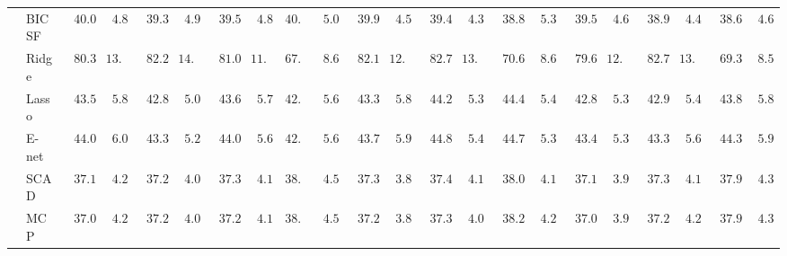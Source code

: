 \begin{tabular}{p{0.2cm}p{1cm}|p{0.6cm}p{0.6cm}|p{0.6cm}p{0.6cm}p{0.6cm}p{0.6cm}p{0.6cm}p{0.6cm}|p{0.6cm}p{0.6cm}p{0.6cm}p{0.6cm}p{0.6cm}p{0.6cm}|p{0.6cm}p{0.6cm}p{0.6cm}p{0.6cm}p{0.6cm}p{0.6cm}}
 & BIC SF  & $\phantom{0}40.00$ & $\phantom{0}4.83$ & $\phantom{0}39.36$ & $\phantom{0}4.97$ & $\phantom{0}39.51$ & $\phantom{0}4.85$ & $40.31$ & $\phantom{0}5.00$ & $\phantom{0}39.90$ & $\phantom{0}4.50$ & $\phantom{0}39.46$ & $\phantom{0}4.39$ & $\phantom{0}38.89$ & $\phantom{0}5.30$ & $\phantom{0}39.50$ & $\phantom{0}4.67$ & $\phantom{0}38.97$ & $\phantom{0}4.46$ & $\phantom{0}38.68$ & $\phantom{0}4.60$ \\
 & Ridge  & $\phantom{0}80.38$ & $13.51$ & $\phantom{0}82.26$ & $14.25$ & $\phantom{0}81.09$ & $11.18$ & $67.17$ & $\phantom{0}8.61$ & $\phantom{0}82.13$ & $12.49$ & $\phantom{0}82.79$ & $13.27$ & $\phantom{0}70.69$ & $\phantom{0}8.69$ & $\phantom{0}79.64$ & $12.80$ & $\phantom{0}82.72$ & $13.44$ & $\phantom{0}69.39$ & $\phantom{0}8.50$ \\
 & Lasso  & $\phantom{0}43.50$ & $\phantom{0}5.87$ & $\phantom{0}42.82$ & $\phantom{0}5.08$ & $\phantom{0}43.65$ & $\phantom{0}5.70$ & $42.61$ & $\phantom{0}5.64$ & $\phantom{0}43.32$ & $\phantom{0}5.86$ & $\phantom{0}44.21$ & $\phantom{0}5.34$ & $\phantom{0}44.44$ & $\phantom{0}5.41$ & $\phantom{0}42.88$ & $\phantom{0}5.31$ & $\phantom{0}42.92$ & $\phantom{0}5.44$ & $\phantom{0}43.84$ & $\phantom{0}5.87$ \\
 & E-net  & $\phantom{0}44.08$ & $\phantom{0}6.04$ & $\phantom{0}43.31$ & $\phantom{0}5.25$ & $\phantom{0}44.09$ & $\phantom{0}5.64$ & $42.96$ & $\phantom{0}5.67$ & $\phantom{0}43.76$ & $\phantom{0}5.98$ & $\phantom{0}44.81$ & $\phantom{0}5.47$ & $\phantom{0}44.79$ & $\phantom{0}5.37$ & $\phantom{0}43.41$ & $\phantom{0}5.39$ & $\phantom{0}43.37$ & $\phantom{0}5.61$ & $\phantom{0}44.33$ & $\phantom{0}5.91$ \\
 & SCAD  & $\phantom{0}37.18$ & $\phantom{0}4.23$ & $\phantom{0}37.24$ & $\phantom{0}4.07$ & $\phantom{0}37.30$ & $\phantom{0}4.19$ & $38.40$ & $\phantom{0}4.55$ & $\phantom{0}37.34$ & $\phantom{0}3.88$ & $\phantom{0}37.45$ & $\phantom{0}4.17$ & $\phantom{0}38.09$ & $\phantom{0}4.19$ & $\phantom{0}37.15$ & $\phantom{0}3.97$ & $\phantom{0}37.38$ & $\phantom{0}4.10$ & $\phantom{0}37.95$ & $\phantom{0}4.32$ \\
 & MCP  & $\phantom{0}37.07$ & $\phantom{0}4.21$ & $\phantom{0}37.20$ & $\phantom{0}4.09$ & $\phantom{0}37.23$ & $\phantom{0}4.15$ & $38.38$ & $\phantom{0}4.54$ & $\phantom{0}37.23$ & $\phantom{0}3.87$ & $\phantom{0}37.35$ & $\phantom{0}4.09$ & $\phantom{0}38.25$ & $\phantom{0}4.27$ & $\phantom{0}37.09$ & $\phantom{0}3.95$ & $\phantom{0}37.27$ & $\phantom{0}4.20$ & $\phantom{0}37.96$ & $\phantom{0}4.31$ \\

\end{tabular}
